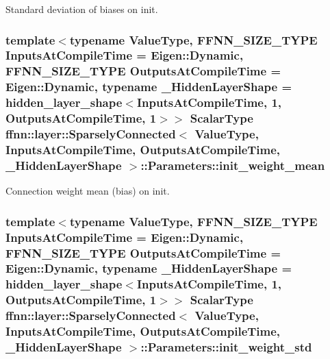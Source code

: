 Standard deviation of biases on init. 

\hypertarget{structffnn_1_1layer_1_1_sparsely_connected_1_1_parameters_a685b96c3c0008391828a257686c22b9a}{
\subsubsection[{init\-\_\-weight\-\_\-mean}]{\setlength{\rightskip}{0pt plus 5cm}template$<$typename Value\-Type, F\-F\-N\-N\-\_\-\-S\-I\-Z\-E\-\_\-\-T\-Y\-P\-E Inputs\-At\-Compile\-Time = Eigen\-::\-Dynamic, F\-F\-N\-N\-\_\-\-S\-I\-Z\-E\-\_\-\-T\-Y\-P\-E Outputs\-At\-Compile\-Time = Eigen\-::\-Dynamic, typename \-\_\-\-Hidden\-Layer\-Shape = hidden\-\_\-layer\-\_\-shape$<$\-Inputs\-At\-Compile\-Time, 1, Outputs\-At\-Compile\-Time, 1$>$$>$ {\bf Scalar\-Type} {\bf ffnn\-::layer\-::\-Sparsely\-Connected}$<$ Value\-Type, Inputs\-At\-Compile\-Time, Outputs\-At\-Compile\-Time, \-\_\-\-Hidden\-Layer\-Shape $>$\-::Parameters\-::init\-\_\-weight\-\_\-mean}}\label{structffnn_1_1layer_1_1_sparsely_connected_1_1_parameters_a685b96c3c0008391828a257686c22b9a}


Connection weight mean (bias) on init. 

\hypertarget{structffnn_1_1layer_1_1_sparsely_connected_1_1_parameters_a53c73023fc8eed25b729108ecaa6b02a}{
\subsubsection[{init\-\_\-weight\-\_\-std}]{\setlength{\rightskip}{0pt plus 5cm}template$<$typename Value\-Type, F\-F\-N\-N\-\_\-\-S\-I\-Z\-E\-\_\-\-T\-Y\-P\-E Inputs\-At\-Compile\-Time = Eigen\-::\-Dynamic, F\-F\-N\-N\-\_\-\-S\-I\-Z\-E\-\_\-\-T\-Y\-P\-E Outputs\-At\-Compile\-Time = Eigen\-::\-Dynamic, typename \-\_\-\-Hidden\-Layer\-Shape = hidden\-\_\-layer\-\_\-shape$<$\-Inputs\-At\-Compile\-Time, 1, Outputs\-At\-Compile\-Time, 1$>$$>$ {\bf Scalar\-Type} {\bf ffnn\-::layer\-::\-Sparsely\-Connected}$<$ Value\-Type, Inputs\-At\-Compile\-Time, Outputs\-At\-Compile\-Time, \-\_\-\-Hidden\-Layer\-Shape $>$\-::Parameters\-::init\-\_\-weight\-\_\-std}}\label{structffnn_1_1layer_1_1_sparsely_connected_1_1_parameters_a53c73023fc8eed25b729108ecaa6b02a}


